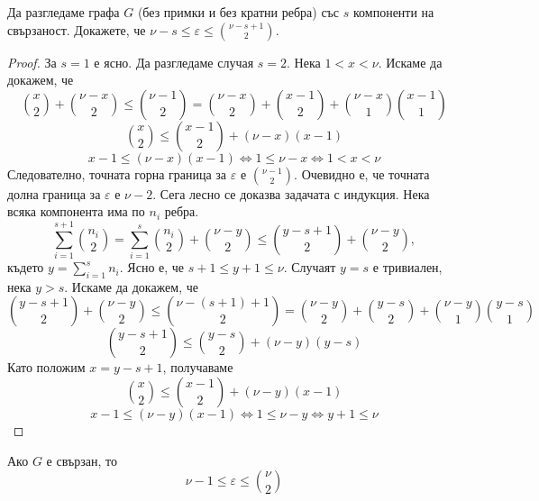 \begin{problem} %
  Да разгледаме графа $G$ (без примки и без кратни ребра) със $s$ компоненти на свързаност.
  Докажете, че $\nu - s \leq \varepsilon \leq \binom{\nu-s+1}{2}$.
\end{problem}
\begin{proof}
  За $s = 1$ е ясно.
  Да разгледаме случая $s = 2$.
  Нека $1 < x <\nu$. Искаме да докажем, че 
  \[\binom{x}{2} + \binom{\nu-x}{2} \leq \binom{\nu-1}{2} = \binom{\nu-x}{2} + \binom{x-1}{2} + \binom{\nu-x}{1}\binom{x-1}{1}\]
  \[\binom{x}{2} \leq \binom{x-1}{2} + (\nu-x)(x-1)\]
  \[x-1 \leq (\nu-x)(x-1) \iff 1 \leq \nu - x \iff 1 < x < \nu\]
  Следователно, точната горна граница за $\varepsilon$ е $\binom{\nu - 1}{2}$. 
  Очевидно е, че точната долна граница за $\varepsilon$ е $\nu - 2$.
  Сега лесно се доказва задачата с индукция.
  Нека всяка компонента има по $n_i$ ребра. 
  \[\sum^{s+1}_{i=1}\binom{n_i}{2} = \sum^{s}_{i=1}\binom{n_i}{2} + \binom{\nu - y}{2} \leq \binom{y-s+1}{2} + \binom{\nu - y}{2},\]
  където $y = \sum^s_{i=1}n_i$. Ясно е, че $s+1\leq y + 1\leq\nu$.
  Случаят $y = s$ е тривиален, нека $y > s$.
  Искаме да докажем, че 
  \[\binom{y-s+1}{2} + \binom{\nu - y}{2} \leq \binom{\nu - (s+1) + 1}{2} = \binom{\nu-y}{2} + \binom{y-s}{2} + \binom{\nu-y}{1}\binom{y-s}{1} \]
  \[\binom{y-s+1}{2} \leq  \binom{y-s}{2} + (\nu-y)(y-s) \]
  Като положим $x = y-s+1$, получаваме
  \[\binom{x}{2} \leq  \binom{x-1}{2} + (\nu-y)(x-1) \]
  \[x-1 \leq (\nu-y)(x-1) \iff 1 \leq \nu - y \iff y+1 \leq \nu\]
\end{proof}

\begin{remark}
  Ако $G$ е свързан, то \[\nu-1\leq\varepsilon\leq\binom{\nu}{2}\]
\end{remark}


